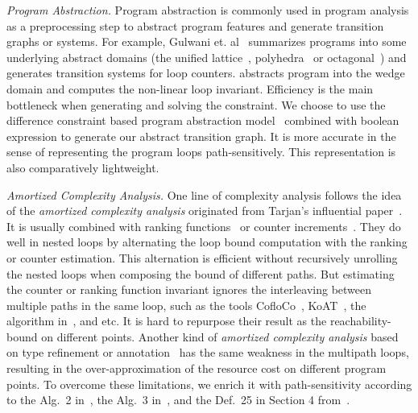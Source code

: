 \emph{Program Abstraction.}
Program abstraction is commonly used in program analysis as a preprocessing step to abstract program features and generate transition graphs or systems. For example, Gulwani et. al~\cite{GulwaniZ10} summarizes programs into some underlying abstract domains (the unified lattice~\cite{CousotH78}, polyhedra~\cite{CousotC77} or octagonal~\cite{Mine06})
and generates transition systems for loop counters.
\cite{KincaidCBR18} abstracts program into the wedge domain and computes the non-linear loop invariant.
Efficiency is the main bottleneck when generating and solving the constraint.
We choose to use the difference constraint based program abstraction model~\cite{SinnZV17,SinnZV14} combined with boolean expression to generate our abstract transition graph.
It is more accurate in the sense of representing the program loops path-sensitively. This representation is also comparatively lightweight.

\emph{Amortized Complexity Analysis.}
One line of complexity analysis follows the idea of the \emph{amortized complexity analysis}
originated from Tarjan's influential paper~\cite{PotechinP17}. It is usually combined with ranking functions~\cite{BradleyMS05,CookSZ13,Zuleger18} or counter increments~\cite{ZulegerGSV11,SinnZV14,SinnZV17,LuCT21,AliasDFG10}.
They do well in nested loops by alternating the loop bound computation with the ranking or counter estimation. This alternation is efficient without recursively unrolling the nested loops when composing the bound of different paths.
  But estimating the counter or ranking function invariant ignores the interleaving between multiple paths in the same loop,
such as the tools CofloCo~\cite{Montoya17,Flores-MontoyaH14,Flores-Montoya16}, KoAT~\cite{BrockschmidtEFFG16,BrockschmidtEFFG14,FalkeKS12,FalkeKS11}, the algorithm in~\cite{LuCT21}, and etc.
It is hard to repurpose their result as the reachability-bound on different points.
Another kind of \emph{amortized complexity analysis} based on type refinement or annotation~\cite{CraryW00,JostHLH10,CicekBG0H17,RajaniG0021,CarbonneauxHS15} has the same weakness in the multipath loops, resulting in the over-approximation of the resource cost on different program points.
To overcome these limitations, we enrich it with path-sensitivity according to the Alg.~2 in~\cite{SinnZV14},
the Alg.~3 in~\cite{ZulegerGSV11},
and the Def.~25 in Section 4 from~\cite{SinnZV17}.

